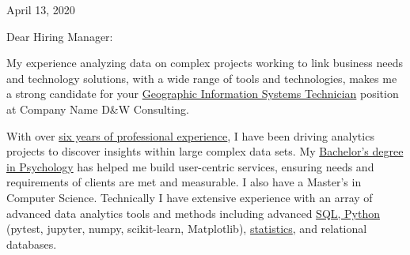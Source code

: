 \documentclass[letterpaper]{article}
\newcommand{\impt}[1]{\uline{#1}}
\newcommand{\CVjobTitle}{Geographic Information Systems Technician}
\newcommand{\CVcompany}{Company Name D&W Consulting}
\begin{document}
\large

\null\hfill April 13, 2020
\vspace{1em}

Dear Hiring Manager:




My experience analyzing data on complex projects working to link business needs
and technology solutions, with a wide range of tools and technologies, makes me
a strong candidate for your \impt{\CVjobTitle} position at \CVcompany.

With over \impt{six years of professional experience}, I have been driving
analytics projects to discover insights within large complex data sets.  
My \impt{Bachelor's degree in Psychology} has helped me build user-centric services,
ensuring needs and requirements of clients are met and measurable.  
I also have a Master's in Computer Science.
Technically I have extensive experience with an array of advanced data analytics
tools and methods including advanced \impt{SQL, Python} (pytest, jupyter, numpy,
scikit-learn, Matplotlib), \impt{statistics}, and relational databases. 
\end{document}
